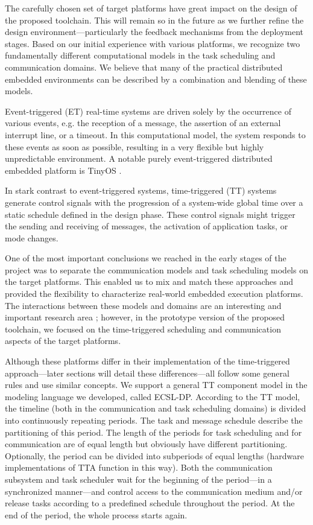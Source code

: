 The carefully chosen set of target platforms have great impact on
the design of the proposed toolchain. This will remain so in the future as we further refine the
design environment---particularly the feedback mechanisms from the
deployment stages. Based on our
initial experience with various platforms, we recognize two
fundamentally different computational models in the task scheduling
and communication domains. We believe that many of the practical
distributed embedded environments can be described by a
combination and blending of these models.

Event-triggered (ET) real-time systems are driven solely by the
occurrence of various events, e.g. the reception of a message, the
assertion of an external interrupt line, or a timeout. In this
computational model, the system responds to these events as
soon as possible, resulting in a very flexible but highly
unpredictable environment. A notable purely event-triggered distributed embedded platform is TinyOS \cite{tinyos}.

In stark contrast to event-triggered systems, time-triggered (TT)
systems generate control signals with the progression of a
system-wide global time over a static schedule defined in
the design phase. These control signals might trigger the sending
and receiving of messages, the activation of application tasks, or
mode changes.

One of the most important conclusions we reached in the early stages
of the project was to separate the communication models and task
scheduling models on the target platforms. This enabled us to mix
and match these approaches and provided the flexibility to
characterize real-world embedded execution platforms. The
interactions between these models and domains are an interesting and
important research area \cite{ucb:ptolemy2}; however, in the
prototype version of the proposed toolchain, we focused on the time-triggered scheduling and communication aspects of the target
platforms.

Although these platforms differ in their implementation of the time-triggered approach---later sections will detail these
differences---all follow some general rules and use similar
concepts. We support a general TT component model in the modeling
language we developed, called ECSL-DP. According to the TT model,
the timeline (both in the
communication and task scheduling domains) is divided into continuously
repeating periods. The task and message schedule describe the
partitioning of this period. The length of the periods for task
scheduling and for communication are of equal length but obviously
have different partitioning. Optionally, the period can be divided
into subperiods of equal lengths (hardware implementations of TTA function in this way). Both the communication
subsystem and task scheduler wait for the beginning of the
period---in a synchronized manner---and control access to the
communication medium and/or release tasks according to a predefined
schedule throughout the period. At the end of the period, the whole
process starts again.

